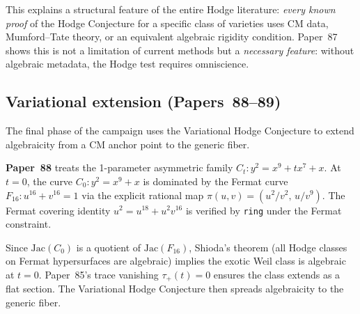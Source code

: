 \documentclass[11pt]{article}
\theoremstyle{plain}
\theoremstyle{definition}
\theoremstyle{remark}
\newcommand{\Jac}{\mathrm{Jac}}
\begin{document}
This explains a structural feature of the entire Hodge literature:
\emph{every known proof} of the Hodge Conjecture for a specific
class of varieties uses CM data, Mumford--Tate theory, or an
equivalent algebraic rigidity condition.  Paper~87 shows this is
not a limitation of current methods but a \emph{necessary feature}:
without algebraic metadata, the Hodge test requires omniscience.


\subsection{Variational extension (Papers~88--89)}

The final phase of the campaign uses the Variational Hodge
Conjecture to extend algebraicity from a CM anchor point to the
generic fiber.

\medskip
\noindent\textbf{Paper~88} \cite{p88} treats the 1-parameter
asymmetric family $C_t: y^2 = x^9 + tx^7 + x$.  At $t = 0$, the
curve $C_0: y^2 = x^9 + x$ is dominated by the Fermat curve
$F_{16}: u^{16} + v^{16} = 1$ via the explicit rational map
$\pi(u,v) = (u^2/v^2,\, u/v^9)$.  The Fermat covering identity
$u^2 = u^{18} + u^2 v^{16}$ is verified by \texttt{ring} under
the Fermat constraint.

Since $\Jac(C_0)$ is a quotient of $\Jac(F_{16})$, Shioda's theorem
\cite{shioda-fermat} (all Hodge classes on Fermat hypersurfaces are
algebraic) implies the exotic Weil class is algebraic at $t = 0$.
Paper~85's trace vanishing $\tau_+(t) = 0$ ensures the class extends
as a flat section.  The Variational Hodge Conjecture
\cite{grothendieck-standard} then spreads algebraicity to the
generic fiber.
\end{document}
